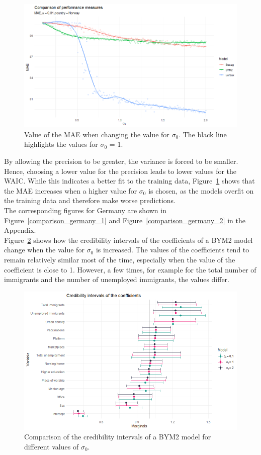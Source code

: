 \begin{figure}[H]
  \centering
  \includegraphics[width = \textwidth]{mae_norway.png}
  \caption{Value of the MAE when changing the value for $\sigma_0$. The black line highlights the values for $\sigma_0$ = 1.}
  \label{comparison_norway_2}
\end{figure}
By allowing the precision to be greater, the variance is forced to be smaller. Hence, choosing a lower value for the precision leads to lower values for the WAIC. While this indicates a better fit to the training data, Figure~\ref{comparison_norway_2} shows that the MAE increases when a higher value for $\sigma_0$ is chosen, as the models overfit on the training data and therefore make worse predictions. \\
The corresponding figures for Germany are shown in Figure~\ref{comparison_germany_1} and Figure~\ref{comparison_germany_2} in the Appendix. \\
Figure~\ref{comparison_norway_5} shows how the credibility intervals of the coefficients of a BYM2 model change when the value for $\sigma_0$ is increased. The values of the coefficients tend to remain relatively similar most of the time, especially when the value of the coefficient is close to 1. However, a few times, for example for the total number of immigrants and the number of unemployed immigrants, the values differ.
\begin{figure}[H]
  \centering
  \includegraphics[width = \textwidth]{intervals_prior_norway.png}
  \caption{Comparison of the credibility intervals of a BYM2 model for different values of $\sigma_0$.}
  \label{comparison_norway_5}
\end{figure}

